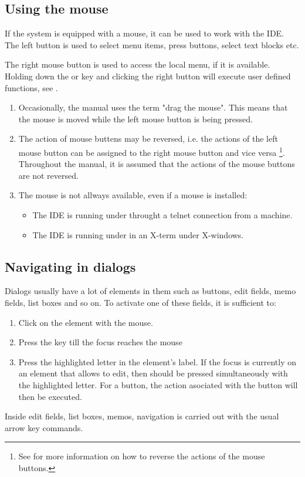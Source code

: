 \subsection{Using the mouse}
\label{suse:mouseusage}
If the system is equipped with a mouse, it can be used to work with the
IDE. The left button is used to select menu items, press buttons, select
text blocks etc. 

The right mouse button is used to access the local menu, if
it is available. Holding down the  or  key and 
clicking the right button will execute user defined functions, 
see .

\begin{remark}
\begin{enumerate}
\item Occasionally, the manual uses the term "drag the mouse". This
means that the mouse is moved while the left mouse button is being 
pressed.
\item 
The action of mouse buttens may be reversed, i.e. the actions of the left
mouse button can be assigned to the right mouse button and vice versa  
\footnote{See  for more information on how to reverse the
actions of the mouse buttons.}. Throughout the manual, it is assumed 
that the actions of the mouse buttons are not reversed.
\item
The mouse is not allways available, even if a mouse is installed:
\begin{itemize}
\item The IDE is running under \linux throught a telnet connection from 
a \windows machine.
\item The IDE is running under \linux in an X-term under X-windows.
\end{itemize}
\end{enumerate}
\end{remark}
%
% 
\subsection{Navigating in dialogs}
\label{se:navigatingdialogs}
Dialogs usually have a lot of elements in them such as buttons, edit fields,
memo fields, list boxes and so on. To activate one of these fields, it is
sufficient to:
\begin{enumerate}
\item Click on the element with the mouse.
\item Press the  key till the focus reaches the mouse
\item Press the highlighted letter in the element's label. If the focus
is currently on an element that allows to edit, then  should be
pressed simultaneously with the highlighted letter. For a button, the action
asociated with the button will then be executed.
\end{enumerate}
Inside edit fields, list boxes, memos, navigation is carried out with the
usual arrow key commands.


